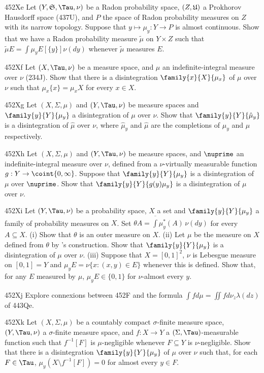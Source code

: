 {\spheader 452Xe Let $(Y,\frak S,\Tau,\nu)$ be a Radon probability space,
$(Z,\frak U)$ a Prokhorov Hausdorff space (437U), and $P$ the space of
Radon probability measures
on $Z$ with its narrow topology.   Suppose that $y\mapsto\mu_y:Y\to P$
is almost continuous.
Show that we have a Radon probability measure $\tilde\mu$ on $Y\times Z$
such that $\tilde\mu E=\int\mu_yE[\{y\}]\nu(dy)$ whenever $\tilde\mu$
measures $E$.

\spheader 452Xf
Let $(X,\Tau,\nu)$ be a measure space, and $\mu$ an indefinite-integral
measure over $\nu$ (234J).
Show that there is a disintegration
$\family{x}{X}{\mu_x}$ of $\mu$ over $\nu$ such that $\mu_x\{x\}=\mu_xX$
for every $x\in X$.

\sqheader 452Xg Let $(X,\Sigma,\mu)$ and $(Y,\Tau,\nu)$ be measure
spaces and $\family{y}{Y}{\mu_y}$ a disintegration of $\mu$ over $\nu$.
Show that $\family{y}{Y}{\hat\mu_y}$ is a disintegration of $\hat\mu$
over $\nu$, where $\hat\mu_y$ and $\hat\mu$ are the completions of
$\mu_y$ and $\mu$ respectively.

\sqheader 452Xh Let $(X,\Sigma,\mu)$ and $(Y,\Tau,\nu)$ be measure
spaces, and $\nuprime$ an indefinite-integral measure over $\nu$,
defined
from a $\nu$-virtually measurable function $g:Y\to\coint{0,\infty}$.
Suppose that
$\family{y}{Y}{\mu_y}$ is a disintegration of $\mu$ over $\nuprime$.
Show
that $\family{y}{Y}{g(y)\mu_y}$ is a disintegration of $\mu$ over $\nu$.

\spheader 452Xi Let $(Y,\Tau,\nu)$ be a probability space, $X$ a set
and $\family{y}{Y}{\mu_y}$ a family of probability measures on $X$.
Set $\theta A=\overline{\int}\mu^*_y(A)\,\nu(dy)$ for every
$A\subseteq X$.   (i) Show that $\theta$ is an outer measure on $X$.
(ii) Let $\mu$ be the measure on $X$ defined from $\theta$ by
\Caratheodory's construction.   Show that $\family{y}{Y}{\mu_y}$ is a
disintegration of $\mu$ over $\nu$.   (iii) Suppose that $X=[0,1]^2$,
$\nu$ is Lebesgue measure on $[0,1]=Y$ and $\mu_yE=\nu\{x:(x,y)\in E\}$
whenever this is defined.   Show that, for any $E$ measured by $\mu$,
$\mu_yE\in\{0,1\}$ for $\nu$-almost every $y$.

\spheader 452Xj Explore connexions between 452F and the formula
$\int fd\mu=\iint fd\nu_z\lambda(dz)$ of 443Qe.

\spheader 452Xk Let $(X,\Sigma,\mu)$ be a countably compact
$\sigma$-finite measure space, $(Y,\Tau,\nu)$ a $\sigma$-finite measure
space, and $f:X\to Y$ a $(\Sigma,\Tau)$-measurable function such that
$f^{-1}[F]$ is $\mu$-negligible whenever $F\subseteq Y$ is
$\nu$-negligible.   Show that there is a disintegration
$\family{y}{Y}{\mu_y}$ of $\mu$ over $\nu$ such that, for each
$F\in\Tau$, $\mu_y(X\setminus f^{-1}[F])=0$ for almost every $y\in F$.

}

